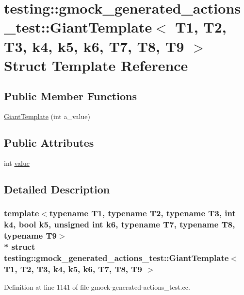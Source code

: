 \hypertarget{structtesting_1_1gmock__generated__actions__test_1_1_giant_template}{}\section{testing\+:\+:gmock\+\_\+generated\+\_\+actions\+\_\+test\+:\+:Giant\+Template$<$ T1, T2, T3, k4, k5, k6, T7, T8, T9 $>$ Struct Template Reference}
\label{structtesting_1_1gmock__generated__actions__test_1_1_giant_template}
\subsection*{Public Member Functions}
\begin{DoxyCompactItemize}
\item 
\hyperlink{structtesting_1_1gmock__generated__actions__test_1_1_giant_template_aaa836b162de31fbd538ffcbed448f430}{Giant\+Template} (int a\+\_\+value)
\end{DoxyCompactItemize}
\subsection*{Public Attributes}
\begin{DoxyCompactItemize}
\item 
int \hyperlink{structtesting_1_1gmock__generated__actions__test_1_1_giant_template_afa0f7a8e5ac8c8b7c59d60ad66980856}{value}
\end{DoxyCompactItemize}


\subsection{Detailed Description}
\subsubsection*{template$<$typename T1, typename T2, typename T3, int k4, bool k5, unsigned int k6, typename T7, typename T8, typename T9$>$\\*
struct testing\+::gmock\+\_\+generated\+\_\+actions\+\_\+test\+::\+Giant\+Template$<$ T1, T2, T3, k4, k5, k6, T7, T8, T9 $>$}



Definition at line 1141 of file gmock-\/generated-\/actions\+\_\+test.\+cc.



